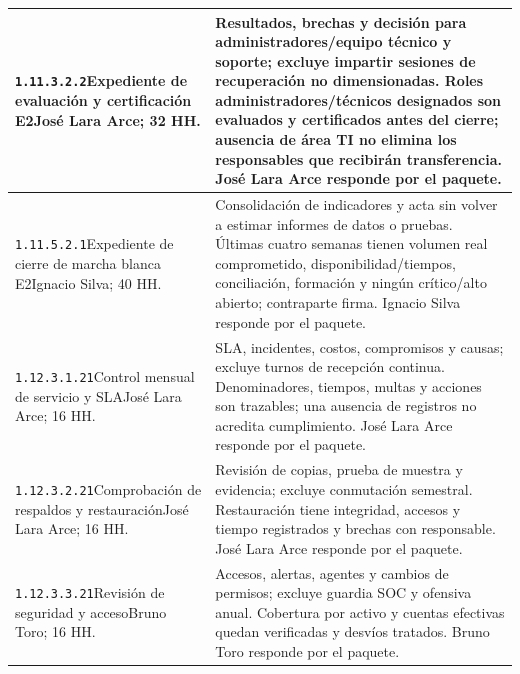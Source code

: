 \begin{longtable}{L{52mm}L{91mm}}
\texttt{1.\allowbreak{}11.\allowbreak{}3.\allowbreak{}2.\allowbreak{}2}\newline Expediente de evaluación y certificación E2\newline José Lara Arce; 32 HH. & Resultados, brechas y decisión para administradores/equipo técnico y soporte; excluye impartir sesiones de recuperación no dimensionadas. Roles administradores/técnicos designados son evaluados y certificados antes del cierre; ausencia de área TI no elimina los responsables que recibirán transferencia. José Lara Arce responde por el paquete.\\\hline
\texttt{1.\allowbreak{}11.\allowbreak{}5.\allowbreak{}2.\allowbreak{}1}\newline Expediente de cierre de marcha blanca E2\newline Ignacio Silva; 40 HH. & Consolidación de indicadores y acta sin volver a estimar informes de datos o pruebas. Últimas cuatro semanas tienen volumen real comprometido, disponibilidad/tiempos, conciliación, formación y ningún crítico/alto abierto; contraparte firma. Ignacio Silva responde por el paquete.\\\hline
\texttt{1.\allowbreak{}12.\allowbreak{}3.\allowbreak{}1.\allowbreak{}21}\newline Control mensual de servicio y SLA\newline José Lara Arce; 16 HH. & SLA, incidentes, costos, compromisos y causas; excluye turnos de recepción continua. Denominadores, tiempos, multas y acciones son trazables; una ausencia de registros no acredita cumplimiento. José Lara Arce responde por el paquete.\\\hline
\texttt{1.\allowbreak{}12.\allowbreak{}3.\allowbreak{}2.\allowbreak{}21}\newline Comprobación de respaldos y restauración\newline José Lara Arce; 16 HH. & Revisión de copias, prueba de muestra y evidencia; excluye conmutación semestral. Restauración tiene integridad, accesos y tiempo registrados y brechas con responsable. José Lara Arce responde por el paquete.\\\hline
\texttt{1.\allowbreak{}12.\allowbreak{}3.\allowbreak{}3.\allowbreak{}21}\newline Revisión de seguridad y acceso\newline Bruno Toro; 16 HH. & Accesos, alertas, agentes y cambios de permisos; excluye guardia SOC y ofensiva anual. Cobertura por activo y cuentas efectivas quedan verificadas y desvíos tratados. Bruno Toro responde por el paquete.\\\hline

\end{longtable}
